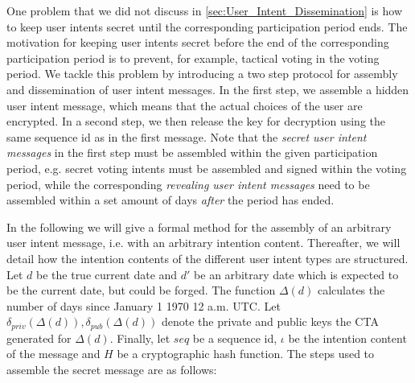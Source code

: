 One problem that we did not discuss in \autoref{sec:User_Intent_Dissemination} is how to keep user intents secret until the corresponding participation period ends.
The motivation for keeping user intents secret before the end of the corresponding participation period is to prevent, for example, tactical voting in the voting period.
We tackle this problem by introducing a two step protocol for assembly and dissemination of user intent messages.
In the first step, we assemble a hidden user intent message, which means that the actual choices of the user are encrypted.
In a second step, we then release the key for decryption using the same sequence id as in the first message.
Note that the \emph{secret user intent messages} in the first step must be assembled within the given participation period, e.g. secret voting intents must be assembled and signed within the voting period, while the corresponding \emph{revealing user intent messages} need to be assembled within a set amount of days \emph{after} the period has ended.

In the following we will give a formal method for the assembly of an arbitrary user intent message, i.e. with an arbitrary intention content.
Thereafter, we will detail how the intention contents of the different user intent types are structured.
Let $d$ be the true current date and $d'$ be an arbitrary date which is expected to be the current date, but could be forged.
The function $\Delta(d)$ calculates the number of days since January 1 1970 12 a.m. UTC.
Let $\delta_\textit{priv}(\Delta(d)), \delta_\textit{pub}(\Delta(d))$ denote the private and public keys the CTA generated for $\Delta(d)$.
Finally, let $seq$ be a sequence id, $\iota$ be the intention content of the message and $H$ be a cryptographic hash function.
The steps used to assemble the secret message are as follows:


